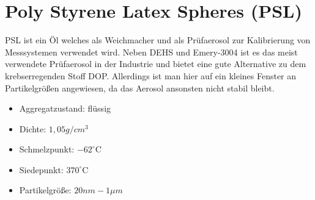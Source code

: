 \section{Poly Styrene Latex Spheres (PSL)}
PSL ist ein \"{O}l welches als Weichmacher und als Pr\"{u}faerosol zur Kalibrierung von Messsystemen verwendet wird. Neben DEHS und Emery-3004 ist es das meist verwendete Pr\"{u}faerosol in der Industrie und bietet eine gute Alternative zu dem krebserregenden Stoff DOP. Allerdings ist man hier auf ein kleines Fenster an Partikelgr\"{o}{\ss}en angewiesen, da das Aerosol ansonsten nicht stabil bleibt.
\begin{itemize}
\item Aggregatzustand: fl\"{u}ssig
\item Dichte: \(1,05 g/cm^3\)
\item Schmelzpunkt: \(-62^\circ\text{C}\)
\item Siedepunkt: \(370^\circ\text{C}\)
\item Partikelgr\"{o}{\ss}e: \(20nm - 1\mu m\)
\end{itemize}